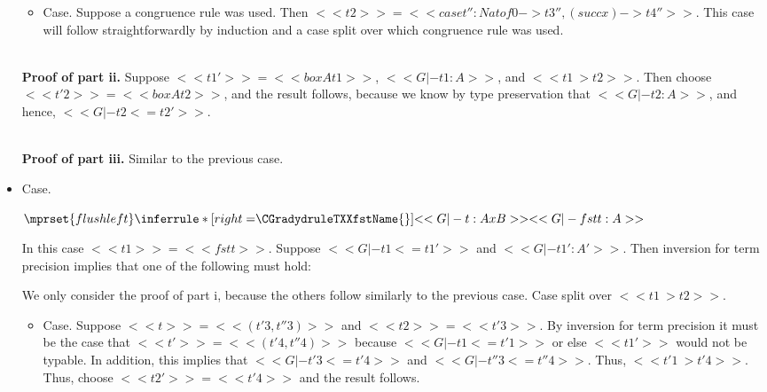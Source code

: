 \begin{itemize}
\begin{itemize}
  \item[] Case.  Suppose a congruence rule was used.  Then $<<t2>> = <<case t'' : Nat of 0 -> t3'', (succ x) -> t4''>>$.
    This case will follow straightforwardly by induction and a case split over which congruence rule was used.    
  \end{itemize}

  \ \\
  \noindent
  \textbf{Proof of part ii.}  Suppose $<<t1'>> = <<box A t1>>$, $<<G |- t1 : A>>$, and $<<t1 ~> t2>>$.
  Then choose $<<t'2>> = <<box A t2>>$, and the result follows, because we know by type preservation
  that $<<G |- t2 : A>>$, and hence, $<<G |- t2 <= t2'>>$.

  \ \\
  \noindent
  \textbf{Proof of part iii.}  Similar to the previous case.  

\item[] Case.\ \\ 
  \begin{center}
    \begin{math}
      $$\mprset{flushleft}
      \inferrule* [right=$\CGradydruleTXXfstName{}$] {
        <<G |- t : A x B>>
      }{<<G |- fst t : A>>}
    \end{math}
  \end{center}
  In this case $<<t1>> = <<fst t>>$.  Suppose $<<G |- t1 <= t1'>>$ and $<<G |- t1' : A'>>$.
  Then inversion for term precision implies that one of the following must hold:

  We only consider the proof of part i, because the others follow similarly to
  the previous case. Case split over $<<t1 ~> t2>>$.
  \begin{itemize}
  \item[] Case. Suppose $<<t>> = <<(t'3,t''3)>>$ and $<<t2>> = <<t'3>>$.  By inversion for term precision it must be the case
    that $<<t'>> = <<(t'4,t''4)>>$ because $<<G |- t1 <= t'1>>$ or else $<<t1'>>$ would not be typable.  In addition,
    this implies that $<<G |- t'3 <= t'4>>$ and $<<G |- t''3 <= t''4>>$.
    Thus, $<<t'1 ~> t'4>>$. Thus, choose $<<t2'>> = <<t'4>>$ and the result follows.


\end{itemize}
\end{itemize}
